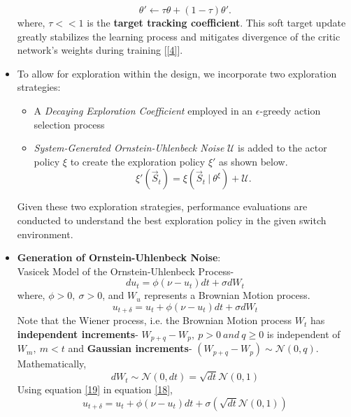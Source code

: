 \documentclass{article}
\begin{document}
\begin{itemize}
    \begin{equation}
        \theta' \longleftarrow \tau \theta + (1 - \tau) \theta'.
    \end{equation}
    where, $\tau << 1$ is the \textbf{target tracking coefficient}. This soft target update greatly stabilizes the learning process and mitigates divergence of the critic network's weights during training [\ref{4}].
    \item To allow for exploration within the design, we incorporate two exploration strategies:
    \begin{itemize}
        \item A \textit{Decaying Exploration Coefficient} employed in an $\epsilon$-greedy action selection process
        \item \textit{System-Generated Ornstein-Uhlenbeck Noise} $\mathcal{U}$ is added to the actor policy $\xi$ to create the exploration policy $\xi'$ as shown below.
        \begin{equation}
            \xi'(\vec{S}_t) = \xi(\vec{S}_t\ |\ \theta^{\xi}) + \mathcal{U}.
        \end{equation}
    \end{itemize}
    Given these two exploration strategies, performance evaluations are conducted to understand the best exploration policy in the given switch environment.
    \item \textbf{Generation of Ornstein-Uhlenbeck Noise}:
    \\Vasicek Model of the Ornstein-Uhlenbeck Process-
    \begin{equation}
        du_{t} = \phi(\nu - u_{t}) dt + \sigma dW_{t}
    \end{equation}
    where, $\phi > 0,\ \sigma > 0$, and $W_u$ represents a Brownian Motion process.
    \begin{equation}\label{18}
        u_{t+\delta} = u_{t} + \phi(\nu - u_{t}) dt + \sigma dW_{t}
    \end{equation}
    Note that the Wiener process, i.e. the Brownian Motion process $W_t$ has \textbf{independent increments}- $W_{p+q} - W_{p},\ p > 0\ and\ q \geq 0$ is independent of $W_{m},\ m < t$ and \textbf{Gaussian increments}- $(W_{p+q} - W_p) \sim \mathcal{N}(0, q)$.
    \\Mathematically,
    \begin{equation}\label{19}
        dW_{t} \sim \mathcal{N}(0, dt) = \sqrt{dt} \mathcal{N}(0, 1)
    \end{equation}
    Using equation \eqref{19} in equation \eqref{18},
    \begin{equation}
        u_{t+\delta} = u_{t} + \phi(\nu - u_{t}) dt + \sigma(\sqrt{dt} \mathcal{N}(0, 1))
    \end{equation}
\end{itemize}
\end{document}
